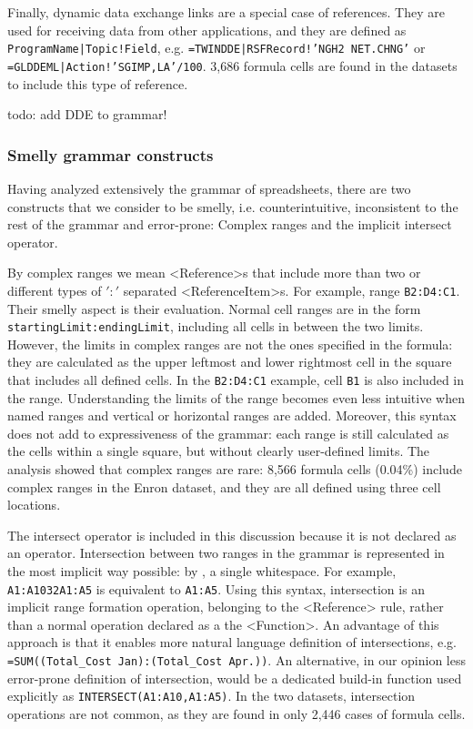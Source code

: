 \documentclass[conference]{IEEEtran}
\begin{document}
Finally, dynamic data exchange links are a special case of references. They are used for receiving data from other applications, and they are defined as \texttt{ProgramName|Topic!Field}, e.g. \texttt{=TWINDDE|RSFRecord!'NGH2 NET.CHNG'} or \texttt{=GLDDEML|Action!'SGIMP,LA'/100}. 3,686 formula cells are found in the datasets to include this type of reference.

todo: add DDE to grammar!
 
\subsubsection{Smelly grammar constructs}
Having analyzed extensively the grammar of spreadsheets, there are two constructs that we consider to be smelly, i.e. counterintuitive, inconsistent to the rest of the grammar and error-prone: Complex ranges and the implicit intersect operator.

By complex ranges we mean <Reference>s that include more than two or different types of $':'$ separated <ReferenceItem>s. For example, range \texttt{B2:D4:C1}. Their smelly aspect is their evaluation. Normal cell ranges are in the form \texttt{startingLimit:endingLimit}, including all cells in between the two limits. However, the limits in complex ranges are not the ones specified in the formula: they are calculated as the upper leftmost and lower rightmost cell in the square that includes all defined cells. In the \texttt{B2:D4:C1} example, cell \texttt{B1} is also included in the range. Understanding the limits of the range becomes even less intuitive when named ranges and vertical or horizontal ranges are added. Moreover, this syntax does not add to expressiveness of the grammar: each range is still calculated as the cells within a single square, but without clearly user-defined limits. The analysis showed that complex ranges are rare: 8,566 formula cells	(0.04\%) include complex ranges in the Enron dataset, and they are all defined using three cell locations. 

The intersect operator is included in this discussion because it is not declared as an operator. Intersection between two ranges in the grammar is represented in the most implicit way possible: by \texttt{}, a single whitespace. For example, \texttt{A1:A10\char32A1:A5} is equivalent to \texttt{A1:A5}. Using this syntax, intersection is an implicit range formation operation, belonging to the <Reference> rule, rather than a normal operation declared as a the <Function>. An advantage of this approach is that it enables more natural language definition of intersections, e.g.  \texttt{=SUM((Total_Cost Jan):(Total_Cost Apr.))}. An alternative, in our opinion less error-prone definition of intersection, would be a dedicated build-in function used explicitly as \texttt{INTERSECT(A1:A10,A1:A5)}. In the two datasets, intersection operations are not common, as they are found in only 2,446 cases of formula cells.
\end{document}
